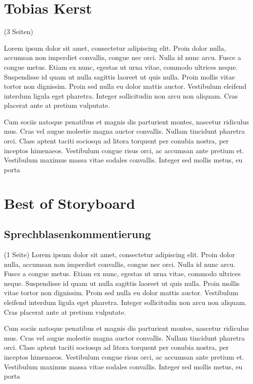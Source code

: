 \clearpage
\section{Tobias Kerst}
\label{sec:kerst}

(3 Seiten)

Lorem ipsum dolor sit amet, consectetur adipiscing elit. Proin dolor nulla, accumsan non imperdiet convallis, congue nec orci. Nulla id nunc arcu. Fusce a congue metus. Etiam ex nunc, egestas ut urna vitae, commodo ultrices neque. Suspendisse id quam ut nulla sagittis laoreet ut quis nulla. Proin mollis vitae tortor non dignissim. Proin sed nulla eu dolor mattis auctor. Vestibulum eleifend interdum ligula eget pharetra. Integer sollicitudin non arcu non aliquam. Cras placerat ante at pretium vulputate.

Cum sociis natoque penatibus et magnis dis parturient montes, nascetur ridiculus mus. Cras vel augue molestie magna auctor convallis. Nullam tincidunt pharetra orci. Class aptent taciti sociosqu ad litora torquent per conubia nostra, per inceptos himenaeos. Vestibulum congue risus orci, ac accumsan ante pretium et. Vestibulum maximus massa vitae sodales convallis. Integer sed mollis metus, eu porta

\clearpage
\section{Best of Storyboard}
\label{sec:bestof}

\subsection{Sprechblasenkommentierung}
\label{sec:sprechblasenkommentierung}

(1 Seite)
Lorem ipsum dolor sit amet, consectetur adipiscing elit. Proin dolor nulla, accumsan non imperdiet convallis, congue nec orci. Nulla id nunc arcu. Fusce a congue metus. Etiam ex nunc, egestas ut urna vitae, commodo ultrices neque. Suspendisse id quam ut nulla sagittis laoreet ut quis nulla. Proin mollis vitae tortor non dignissim. Proin sed nulla eu dolor mattis auctor. Vestibulum eleifend interdum ligula eget pharetra. Integer sollicitudin non arcu non aliquam. Cras placerat ante at pretium vulputate.

Cum sociis natoque penatibus et magnis dis parturient montes, nascetur ridiculus mus. Cras vel augue molestie magna auctor convallis. Nullam tincidunt pharetra orci. Class aptent taciti sociosqu ad litora torquent per conubia nostra, per inceptos himenaeos. Vestibulum congue risus orci, ac accumsan ante pretium et. Vestibulum maximus massa vitae sodales convallis. Integer sed mollis metus, eu porta

